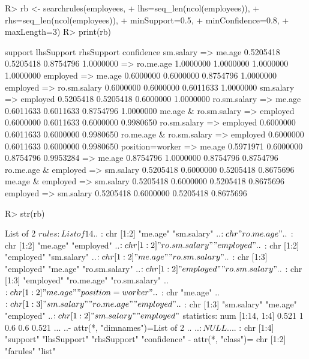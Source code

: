 \documentclass{article}\usepackage[]{graphicx}\usepackage[]{color}
\begin{document}
\begin{Schunk}
% --begin: "searchrules"
\begin{Sinput}
R> rb <- searchrules(employees,
+                    lhs=seq_len(ncol(employees)),
+                    rhs=seq_len(ncol(employees)),
+                    minSupport=0.5,
+                    minConfidence=0.8,
+                    maxLength=3)
R> print(rb)
\end{Sinput}
\begin{Soutput}
                                       support lhsSupport rhsSupport confidence
sm.salary => me.age                  0.5205418  0.5205418  0.8754796  1.0000000
 => ro.me.age                        1.0000000  1.0000000  1.0000000  1.0000000
employed => me.age                   0.6000000  0.6000000  0.8754796  1.0000000
employed => ro.sm.salary             0.6000000  0.6000000  0.6011633  1.0000000
sm.salary => employed                0.5205418  0.5205418  0.6000000  1.0000000
ro.sm.salary => me.age               0.6011633  0.6011633  0.8754796  1.0000000
me.age & ro.sm.salary => employed    0.6000000  0.6011633  0.6000000  0.9980650
ro.sm.salary => employed             0.6000000  0.6011633  0.6000000  0.9980650
ro.me.age & ro.sm.salary => employed 0.6000000  0.6011633  0.6000000  0.9980650
position=worker => me.age            0.5971971  0.6000000  0.8754796  0.9953284
 => me.age                           0.8754796  1.0000000  0.8754796  0.8754796
ro.me.age & employed => sm.salary    0.5205418  0.6000000  0.5205418  0.8675696
me.age & employed => sm.salary       0.5205418  0.6000000  0.5205418  0.8675696
employed => sm.salary                0.5205418  0.6000000  0.5205418  0.8675696
\end{Soutput}
%
% --end: "searchrules"
\end{Schunk}

\begin{Schunk}
% --begin: "searchrules2"
\begin{Sinput}
R> str(rb)
\end{Sinput}
\begin{Soutput}
List of 2
 $ rules     :List of 14
  ..$ : chr [1:2] "me.age" "sm.salary"
  ..$ : chr "ro.me.age"
  ..$ : chr [1:2] "me.age" "employed"
  ..$ : chr [1:2] "ro.sm.salary" "employed"
  ..$ : chr [1:2] "employed" "sm.salary"
  ..$ : chr [1:2] "me.age" "ro.sm.salary"
  ..$ : chr [1:3] "employed" "me.age" "ro.sm.salary"
  ..$ : chr [1:2] "employed" "ro.sm.salary"
  ..$ : chr [1:3] "employed" "ro.me.age" "ro.sm.salary"
  ..$ : chr [1:2] "me.age" "position=worker"
  ..$ : chr "me.age"
  ..$ : chr [1:3] "sm.salary" "ro.me.age" "employed"
  ..$ : chr [1:3] "sm.salary" "me.age" "employed"
  ..$ : chr [1:2] "sm.salary" "employed"
 $ statistics: num [1:14, 1:4] 0.521 1 0.6 0.6 0.521 ...
  ..- attr(*, "dimnames")=List of 2
  .. ..$ : NULL
  .. ..$ : chr [1:4] "support" "lhsSupport" "rhsSupport" "confidence"
 - attr(*, "class")= chr [1:2] "farules" "list"
\end{Soutput}
%
% --end: "searchrules2"
\end{Schunk}
\end{document}
